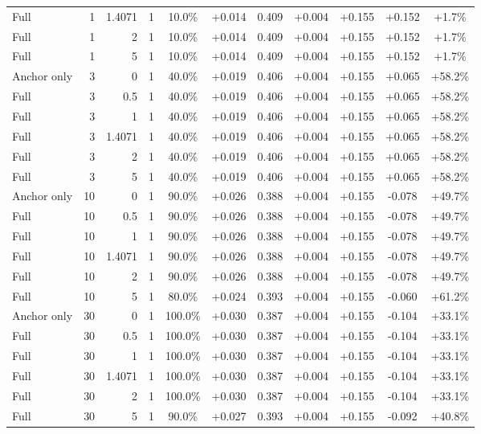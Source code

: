 \begin{table}[htbp]
\begin{tabular}{lrrrccccccc}
Full & 1 & 1.4071 & 1 & 10.0\% & +0.014 & 0.409 & +0.004 & +0.155 & +0.152 & +1.7\% \\
Full & 1 & 2 & 1 & 10.0\% & +0.014 & 0.409 & +0.004 & +0.155 & +0.152 & +1.7\% \\
Full & 1 & 5 & 1 & 10.0\% & +0.014 & 0.409 & +0.004 & +0.155 & +0.152 & +1.7\% \\
Anchor only & 3 & 0 & 1 & 40.0\% & +0.019 & 0.406 & +0.004 & +0.155 & +0.065 & +58.2\% \\
Full & 3 & 0.5 & 1 & 40.0\% & +0.019 & 0.406 & +0.004 & +0.155 & +0.065 & +58.2\% \\
Full & 3 & 1 & 1 & 40.0\% & +0.019 & 0.406 & +0.004 & +0.155 & +0.065 & +58.2\% \\
Full & 3 & 1.4071 & 1 & 40.0\% & +0.019 & 0.406 & +0.004 & +0.155 & +0.065 & +58.2\% \\
Full & 3 & 2 & 1 & 40.0\% & +0.019 & 0.406 & +0.004 & +0.155 & +0.065 & +58.2\% \\
Full & 3 & 5 & 1 & 40.0\% & +0.019 & 0.406 & +0.004 & +0.155 & +0.065 & +58.2\% \\
Anchor only & 10 & 0 & 1 & 90.0\% & +0.026 & 0.388 & +0.004 & +0.155 & -0.078 & +49.7\% \\
Full & 10 & 0.5 & 1 & 90.0\% & +0.026 & 0.388 & +0.004 & +0.155 & -0.078 & +49.7\% \\
Full & 10 & 1 & 1 & 90.0\% & +0.026 & 0.388 & +0.004 & +0.155 & -0.078 & +49.7\% \\
Full & 10 & 1.4071 & 1 & 90.0\% & +0.026 & 0.388 & +0.004 & +0.155 & -0.078 & +49.7\% \\
Full & 10 & 2 & 1 & 90.0\% & +0.026 & 0.388 & +0.004 & +0.155 & -0.078 & +49.7\% \\
Full & 10 & 5 & 1 & 80.0\% & +0.024 & 0.393 & +0.004 & +0.155 & -0.060 & +61.2\% \\
Anchor only & 30 & 0 & 1 & 100.0\% & +0.030 & 0.387 & +0.004 & +0.155 & -0.104 & +33.1\% \\
Full & 30 & 0.5 & 1 & 100.0\% & +0.030 & 0.387 & +0.004 & +0.155 & -0.104 & +33.1\% \\
Full & 30 & 1 & 1 & 100.0\% & +0.030 & 0.387 & +0.004 & +0.155 & -0.104 & +33.1\% \\
Full & 30 & 1.4071 & 1 & 100.0\% & +0.030 & 0.387 & +0.004 & +0.155 & -0.104 & +33.1\% \\
Full & 30 & 2 & 1 & 100.0\% & +0.030 & 0.387 & +0.004 & +0.155 & -0.104 & +33.1\% \\
Full & 30 & 5 & 1 & 90.0\% & +0.027 & 0.393 & +0.004 & +0.155 & -0.092 & +40.8\% \\

\end{tabular}
\end{table}
